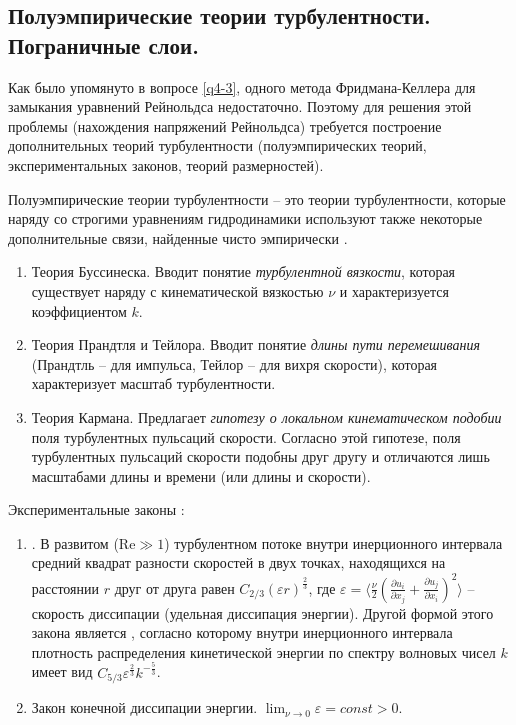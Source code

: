 \subsection{Полуэмпирические теории турбулентности. Пограничные слои.}
Как было упомянуто в вопросе \ref{q4-3}, одного метода Фридмана-Келлера для замыкания уравнений Рейнольдса недостаточно.
Поэтому для решения этой проблемы (нахождения напряжений Рейнольдса) требуется построение дополнительных теорий турбулентности (полуэмпирических теорий, экспериментальных законов, теорий размерностей).

Полуэмпирические теории турбулентности -- это теории турбулентности, которые наряду со строгими уравнениям гидродинамики используют также некоторые дополнительные связи, найденные чисто эмпирически \cite{Носов-2013}.
\begin{enumerate}
\item Теория Буссинеска. Вводит понятие \textit{турбулентной вязкости}, которая существует наряду с кинематической вязкостью $\nu$ и характеризуется коэффициентом $k$.
\item Теория Прандтля и Тейлора. Вводит понятие \textit{длины пути перемешивания} (Прандтль -- для импульса, Тейлор -- для вихря скорости), которая характеризует масштаб турбулентности.
\item Теория Кармана. Предлагает \textit{гипотезу о локальном кинематическом подобии} поля турбулентных пульсаций скорости. Согласно этой гипотезе, поля турбулентных пульсаций скорости подобны друг другу и отличаются лишь масштабами длины и времени (или длины и скорости).
\end{enumerate}

Экспериментальные законы \cite{Носов-2013}:
\begin{enumerate}
\item {}. В развитом ($\text{Re}\gg 1$) турбулентном потоке внутри инерционного интервала средний квадрат разности скоростей в двух точках, находящихся на расстоянии $r$ друг от друга равен $C_{2/3}\left(\varepsilon r\right)^\frac{2}{3}$, где $\varepsilon=\langle\frac{\nu}{2}\left(\frac{\partial u_i}{\partial x_j}+\frac{\partial u_j}{\partial x_i}\right)^2\rangle$ -- скорость диссипации (удельная диссипация энергии). Другой формой этого закона является , согласно которому внутри инерционного интервала плотность распределения кинетической энергии по спектру волновых чисел $k$ имеет вид $C_{5/3}\varepsilon^\frac{2}{3}k^{-\frac{5}{3}}$.
\item Закон конечной диссипации энергии. $\lim_{\nu\to 0} \varepsilon=const>0$.
\end{enumerate}

